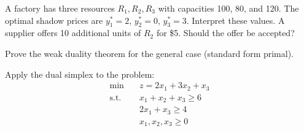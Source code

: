 \begin{exercise}
A factory has three resources $R_1, R_2, R_3$ with capacities 100, 80, and
120.  The optimal shadow prices are $y_1^* = 2$, $y_2^* = 0$, $y_3^* = 3$.
Interpret these values.  A supplier offers 10 additional units of $R_2$ for
\$5.  Should the offer be accepted?
\end{exercise}

\begin{exercise}
Prove the weak duality theorem for the general case (standard form primal).
\end{exercise}

\begin{exercise}
Apply the dual simplex to the problem:
\[
\begin{aligned}
  \min \quad & z = 2x_1 + 3x_2 + x_3 \\
  \text{s.t.} \quad
    & x_1 + x_2 + x_3 \ge 6 \\
    & 2x_1 + x_3 \ge 4 \\
    & x_1, x_2, x_3 \ge 0
\end{aligned}
\]
\end{exercise}
